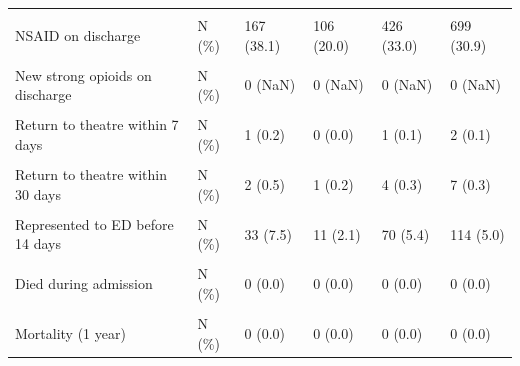 \documentclass[
  letterpaper,
  DIV=11,
  numbers=noendperiod]{scrreprt}
\begin{document}
\begin{stbl}
{\begin{table}
\begin{tabular*}{\linewidth}{@{\extracolsep{\fill}}llllll}
{\cellcolor[HTML]{F2F2F2}{Paracetamol on discharge}} & {\cellcolor[HTML]{F2F2F2}{N (\%)}} & {\cellcolor[HTML]{F2F2F2}{176 (40.2)}} & {\cellcolor[HTML]{F2F2F2}{127 (24.0)}} & {\cellcolor[HTML]{F2F2F2}{457 (35.4)}} & {\cellcolor[HTML]{F2F2F2}{760 (33.6)}} \\ 
{NSAID on discharge} & {N (\%)} & {167 (38.1)} & {106 (20.0)} & {426 (33.0)} & {699 (30.9)} \\ 
{\cellcolor[HTML]{F2F2F2}{Strong opioid perscribed on discharge}} & {\cellcolor[HTML]{F2F2F2}{N (\%)}} & {\cellcolor[HTML]{F2F2F2}{0 (0.0)}} & {\cellcolor[HTML]{F2F2F2}{0 (0.0)}} & {\cellcolor[HTML]{F2F2F2}{5 (0.4)}} & {\cellcolor[HTML]{F2F2F2}{5 (0.2)}} \\ 
{New strong opioids on discharge} & {N (\%)} & {0 (NaN)} & {0 (NaN)} & {0 (NaN)} & {0 (NaN)} \\ 
{\cellcolor[HTML]{F2F2F2}{Weak opioid on discharge}} & {\cellcolor[HTML]{F2F2F2}{N (\%)}} & {\cellcolor[HTML]{F2F2F2}{23 (5.3)}} & {\cellcolor[HTML]{F2F2F2}{2 (0.4)}} & {\cellcolor[HTML]{F2F2F2}{8 (0.6)}} & {\cellcolor[HTML]{F2F2F2}{33 (1.5)}} \\ 
{Return to theatre within 7 days} & {N (\%)} & {1 (0.2)} & {0 (0.0)} & {1 (0.1)} & {2 (0.1)} \\ 
{\cellcolor[HTML]{F2F2F2}{Return to theatre within 14 days}} & {\cellcolor[HTML]{F2F2F2}{N (\%)}} & {\cellcolor[HTML]{F2F2F2}{2 (0.5)}} & {\cellcolor[HTML]{F2F2F2}{0 (0.0)}} & {\cellcolor[HTML]{F2F2F2}{4 (0.3)}} & {\cellcolor[HTML]{F2F2F2}{6 (0.3)}} \\ 
{Return to theatre within 30 days} & {N (\%)} & {2 (0.5)} & {1 (0.2)} & {4 (0.3)} & {7 (0.3)} \\ 
{\cellcolor[HTML]{F2F2F2}{Represented to ED before 7 days}} & {\cellcolor[HTML]{F2F2F2}{N (\%)}} & {\cellcolor[HTML]{F2F2F2}{27 (6.2)}} & {\cellcolor[HTML]{F2F2F2}{7 (1.3)}} & {\cellcolor[HTML]{F2F2F2}{58 (4.5)}} & {\cellcolor[HTML]{F2F2F2}{92 (4.1)}} \\ 
{Represented to ED before 14 days} & {N (\%)} & {33 (7.5)} & {11 (2.1)} & {70 (5.4)} & {114 (5.0)} \\ 
{\cellcolor[HTML]{F2F2F2}{Represented to ED before 30 days}} & {\cellcolor[HTML]{F2F2F2}{N (\%)}} & {\cellcolor[HTML]{F2F2F2}{38 (8.7)}} & {\cellcolor[HTML]{F2F2F2}{14 (2.6)}} & {\cellcolor[HTML]{F2F2F2}{78 (6.0)}} & {\cellcolor[HTML]{F2F2F2}{130 (5.8)}} \\ 
{Died during admission} & {N (\%)} & {0 (0.0)} & {0 (0.0)} & {0 (0.0)} & {0 (0.0)} \\ 
{\cellcolor[HTML]{F2F2F2}{Mortality (90 days)}} & {\cellcolor[HTML]{F2F2F2}{N (\%)}} & {\cellcolor[HTML]{F2F2F2}{0 (0.0)}} & {\cellcolor[HTML]{F2F2F2}{0 (0.0)}} & {\cellcolor[HTML]{F2F2F2}{0 (0.0)}} & {\cellcolor[HTML]{F2F2F2}{0 (0.0)}} \\ 
{Mortality (1 year)} & {N (\%)} & {0 (0.0)} & {0 (0.0)} & {0 (0.0)} & {0 (0.0)} \\ 
\bottomrule
\end{tabular*}
\end{table}

}
\end{stbl}
\end{document}
